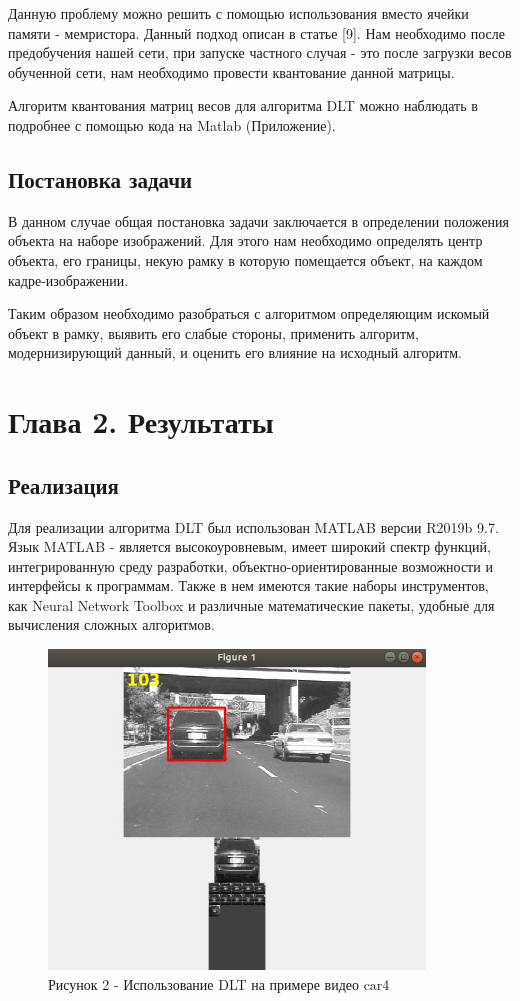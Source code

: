 \documentclass[14pt, a4paper]{article}
\begin{document}
Данную проблему можно решить с помощью использования вместо ячейки памяти - мемристора. Данный подход описан в статье [9]. Нам необходимо после предобучения нашей сети, при запуске частного случая - это после загрузки весов обученной сети, нам необходимо провести квантование данной матрицы. 

Алгоритм квантования матриц весов для алгоритма DLT можно наблюдать в подробнее с помощью кода на Matlab (Приложение).

\subsection{Постановка задачи}

В данном случае общая постановка задачи заключается в определении положения объекта на наборе изображений. Для этого нам необходимо определять центр объекта, его границы, некую рамку в которую помещается объект, на каждом кадре-изображении.

Таким образом необходимо разобраться с алгоритмом определяющим искомый объект в рамку, выявить его слабые стороны, применить алгоритм, модернизирующий данный, и оценить его влияние на исходный алгоритм.

\newpage
\section*{Глава 2. Результаты}

\setcounter{section}{4}
\setcounter{subsection}{0}

\subsection{Реализация}
 Для реализации алгоритма DLT был использован MATLAB версии R2019b 9.7. Язык MATLAB - является высокоуровневым, имеет широкий спектр функций, интегрированную среду разработки, объектно-ориентированные возможности и интерфейсы к программам. Также в нем имеются такие наборы инструментов, как Neural Network Toolbox и различные математические пакеты, удобные для вычисления сложных алгоритмов.
 
 \begin{figure}[h]
    \label{car4}
    \centering
    \includegraphics[width=10cm]{CySy3-U4mFg.jpg}
    \caption*{Рисунок 2 - Использование DLT на примере видео car4}
\end{figure}
 
\end{document}
